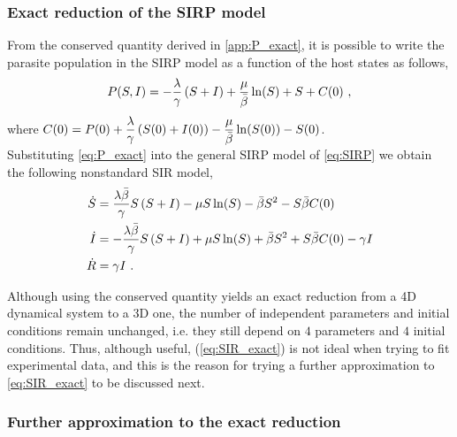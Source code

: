 \subsubsection{Exact reduction of the SIRP model} \label{sec:exactred}

From the conserved quantity derived in	\ref{app:P_exact}, it is possible
to write the parasite population in the SIRP model as a function of the host
states as follows,
\begin{equation}\label{eq:P_exact}
    P(S,I)=-\frac{\lambda}{\gamma}\left(S+I\right) +
    \frac{\mu}{\bar{\beta}}\ln(S) + S + C(0) \ ,
\end{equation}
where $C(0)=P(0)+\displaystyle\frac{\lambda}{\gamma}\left(S(0)+I(0)\right) -
    \frac{\mu}{\bar{\beta}}\ln(S(0)) - S(0)$.\\

Substituting \cref{eq:P_exact} into the general SIRP model of
\cref{eq:SIRP} we obtain the following nonstandard SIR model,
\begin{equation}\label{eq:SIR_exact}
    \begin{aligned}
        \dot{S} & = \frac{\lambda\bar{\beta}}{\gamma}S\left(S+I\right) - \mu
        S\ln(S) - \bar{\beta} S^2 - S\bar{\beta} C(0)                        \\
        \dot{I} & = -\frac{\lambda\bar{\beta}}{\gamma}S\left(S+I\right) + \mu
        S\ln(S) + \bar{\beta} S^2 + S\bar{\beta} C(0) -\gamma I              \\
        \dot{R} & =\gamma I \ .
    \end{aligned}
\end{equation}

Although using the conserved quantity yields an exact reduction from a 4D
dynamical system to a 3D one, the number of independent parameters and initial
conditions remain unchanged, i.e. they still depend on $4$ parameters and $4$
initial conditions. Thus, although useful, (\ref{eq:SIR_exact}) is not ideal
when trying to fit experimental data, and this is the reason for trying a
further approximation to \cref{eq:SIR_exact} to be discussed next.

\subsubsection{Further approximation to the exact reduction}
\label{sec:exactredapp}


